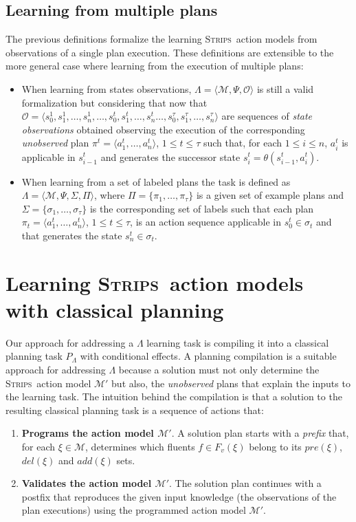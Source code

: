 \documentclass[3p,times]{elsarticle}
\newcommand{\strips}{\textsc{Strips}}     %
\newcommand{\tup}[1]{{\langle #1 \rangle}}
\begin{document}
\subsection{Learning from multiple plans}
The previous definitions formalize the learning \strips\ action models from observations of a single plan execution. These definitions are extensible to the more general case where learning from the execution of multiple plans:
\begin{itemize}
  \item When learning from states observations, $\Lambda=\tup{\mathcal{M},\Psi,\mathcal{O}}$ is still a valid formalization but considering that now that $\mathcal{O}=\tup{s_0^1,s_1^1,\ldots,s_{n}^1,\ldots,s_0^t,s_1^t,\ldots,s_{n}^t\ldots,s_0^{\tau},s_1^{\tau},\ldots,s_{n}^{\tau}}$ are sequences of {\em state observations} obtained observing the execution of the corresponding {\em unobserved} plan $\pi^t=\tup{a_1^t, \ldots, a_n^t}$, {\tt\small $1\leq t\leq \tau$} such that, for each {\small $1\leq i\leq n$}, $a_i^t$ is applicable in $s_{i-1}^t$ and generates the successor state $s_i^t=\theta(s_{i-1}^t,a_i^t)$.
  \item When learning from a set of labeled plans the task is defined as $\Lambda=\tup{\mathcal{M},\Psi,\Sigma,\Pi}$, where $\Pi=\{\pi_1,\ldots,\pi_{\tau}\}$ is a given set of example plans and $\Sigma=\{\sigma_1,\ldots,\sigma_{\tau}\}$ is the corresponding set of labels such that each plan $\pi_t=\tup{a_1^t, \ldots, a_n^t}$, {\tt\small $1\leq t\leq \tau$}, is an action sequence applicable in $s_0^t\in\sigma_t$ and that generates the state $s_n^t\in\sigma_t$.
\end{itemize}  



\section{Learning \strips\ action models with classical planning}
\label{sec:Section5}
Our approach for addressing a $\Lambda$ learning task is compiling it into a classical planning task $P_{\Lambda}$ with conditional effects. A planning compilation is a suitable approach for addressing $\Lambda$ because a solution must not only determine the \strips\ action model $\mathcal{M}'$ but also, the {\em unobserved} plans that explain the inputs to the learning task. The intuition behind the compilation is that a solution to the resulting classical planning task is a sequence of actions that:

\begin{enumerate}
\item {\bf Programs the action model $\mathcal{M}'$}. A solution plan starts with a {\em prefix} that, for each $\xi\in\mathcal{M}$, determines which fluents $f\in F_v(\xi)$ belong to its $pre(\xi)$, $del(\xi)$ and $add(\xi)$ sets.
\item {\bf Validates the action model $\mathcal{M}'$}. The solution plan continues with a postfix that reproduces the given input knowledge (the observations of the plan executions) using the programmed action model $\mathcal{M}'$.
\end{enumerate}
\end{document}
